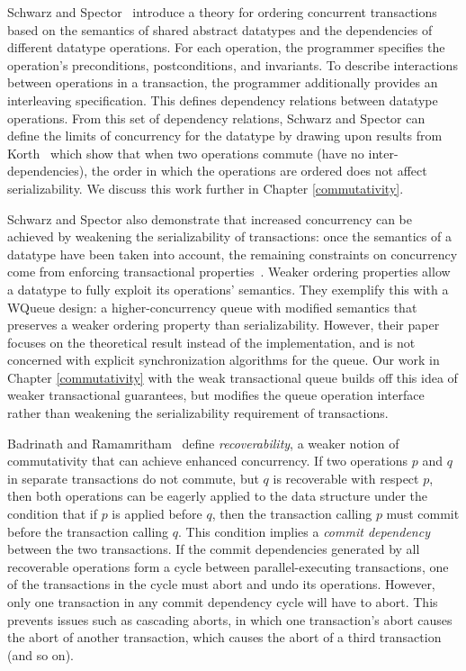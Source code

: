 Schwarz and Spector~\cite{schwarz} introduce a theory for ordering concurrent transactions based on the semantics of shared abstract datatypes and the dependencies of different datatype operations. For each operation, the programmer specifies the operation's preconditions, postconditions, and invariants. To describe interactions between operations in a transaction, the programmer additionally provides an interleaving specification. This defines dependency relations between datatype operations. From this set of dependency relations, Schwarz and Spector can define the limits of concurrency for the datatype by drawing upon results from Korth~\cite{korth} which show that when two operations commute (have no inter-dependencies), the order in which the operations are ordered does not affect serializability. We discuss this work further in Chapter \ref{commutativity}. 

Schwarz and Spector also demonstrate that increased concurrency can be achieved by weakening the serializability of transactions: once the semantics of a datatype have been taken into account, the remaining constraints on concurrency come from enforcing transactional properties~\cite{kung}. Weaker ordering properties allow a datatype to fully exploit its operations' semantics. They exemplify this with a WQueue design: a higher-concurrency queue with modified semantics that preserves a weaker ordering property than serializability. However, their paper focuses on the theoretical result instead of the implementation, and is not concerned with explicit synchronization algorithms for the queue. Our work in Chapter \ref{commutativity} with the weak transactional queue builds off this idea of weaker transactional guarantees, but modifies the queue operation interface rather than weakening the serializability requirement of transactions.

Badrinath and Ramamritham~\cite{badrinath} define \emph{recoverability}, a weaker notion of commutativity that can achieve enhanced concurrency. If two operations $p$ and $q$ in separate transactions do not commute, but $q$ is recoverable with respect $p$, then both operations can be eagerly applied to the data structure under the condition that if $p$ is applied before $q$, then the transaction calling $p$ must commit before the transaction calling $q$. This condition implies a \emph{commit dependency} between the two transactions. 
If the commit dependencies generated by all recoverable operations form a cycle between parallel-executing transactions, one of the transactions in the cycle must abort and undo its operations. However, only one transaction in any commit dependency cycle will have to abort. This prevents issues such as cascading aborts, in which one transaction's abort causes the abort of another transaction, which causes the abort of a third transaction (and so on).

